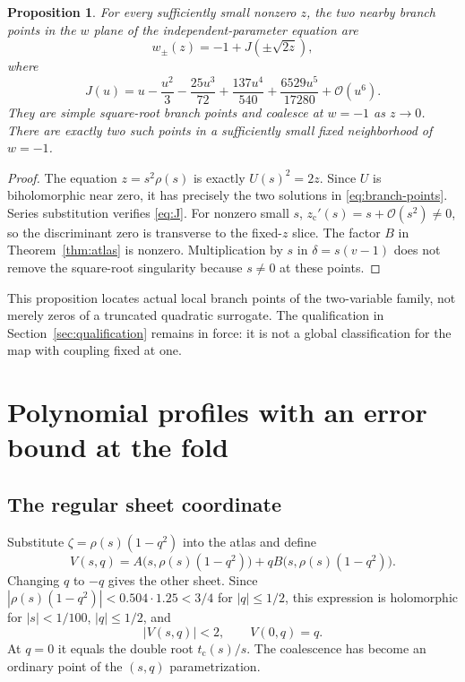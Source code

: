 \documentclass[11pt,a4paper]{article}
\newtheorem{proposition}[theorem]{Proposition}
\theoremstyle{definition}
\theoremstyle{remark}
\newcommand{\OO}{\mathcal O}
\newcommand{\tc}{t_{\mathrm c}}
\newcommand{\zc}{z_{\mathrm c}}
\begin{document}
\begin{proposition}\label{prop:branch-points}
For every sufficiently small nonzero $z$, the two nearby branch points
in the $w$ plane of the independent-parameter equation are
\begin{equation}\label{eq:branch-points}
 w_\pm(z)=-1+J(\pm\sqrt{2z}),
\end{equation}
where
\begin{equation}\label{eq:J}
 J(u)=u-\frac{u^2}{3}-\frac{25u^3}{72}
               +\frac{137u^4}{540}+\frac{6529u^5}{17280}+\OO(u^6).
\end{equation}
They are simple square-root branch points and coalesce at $w=-1$ as
$z\to0$. There are exactly two such points in a sufficiently small fixed
neighborhood of $w=-1$.
\end{proposition}
\begin{proof}
The equation $z=s^2\rho(s)$ is exactly $U(s)^2=2z$. Since $U$ is
biholomorphic near zero, it has precisely the two solutions in
\eqref{eq:branch-points}. Series substitution verifies \eqref{eq:J}.
For nonzero small $s$, $\zc'(s)=s+\OO(s^2)\ne0$, so the discriminant
zero is transverse to the fixed-$z$ slice. The factor $B$ in
Theorem~\ref{thm:atlas} is nonzero. Multiplication by $s$ in
$\delta=s(v-1)$ does not remove the square-root singularity because
$s\ne0$ at these points.
\end{proof}

This proposition locates actual local branch points of the two-variable
family, not merely zeros of a truncated quadratic surrogate. The
qualification in Section~\ref{sec:qualification} remains in force: it is
not a global classification for the map with coupling fixed at one.

\section{Polynomial profiles with an error bound at the fold}
\label{sec:profiles}

\subsection{The regular sheet coordinate}
Substitute $\zeta=\rho(s)(1-q^2)$ into the atlas and define
\begin{equation}\label{eq:V}
 V(s,q)=A\bigl(s,\rho(s)(1-q^2)\bigr)
       +qB\bigl(s,\rho(s)(1-q^2)\bigr).
\end{equation}
Changing $q$ to $-q$ gives the other sheet. Since
$|\rho(s)(1-q^2)|<0.504\cdot1.25<3/4$ for $|q|\le1/2$, this expression
is holomorphic for $|s|<1/100$, $|q|\le1/2$, and
\begin{equation}\label{eq:V-bound}
 |V(s,q)|<2,\qquad V(0,q)=q.
\end{equation}
At $q=0$ it equals the double root $\tc(s)/s$. The coalescence has become
an ordinary point of the $(s,q)$ parametrization.
\end{document}
